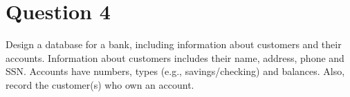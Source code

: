 
\section*{Question 4}

Design a database for a bank, including information about customers and their accounts.
Information about customers includes their name, address, phone and SSN.
Accounts have numbers, types (e.g., savings/checking) and balances.
Also, record the customer(s) who own an account.


